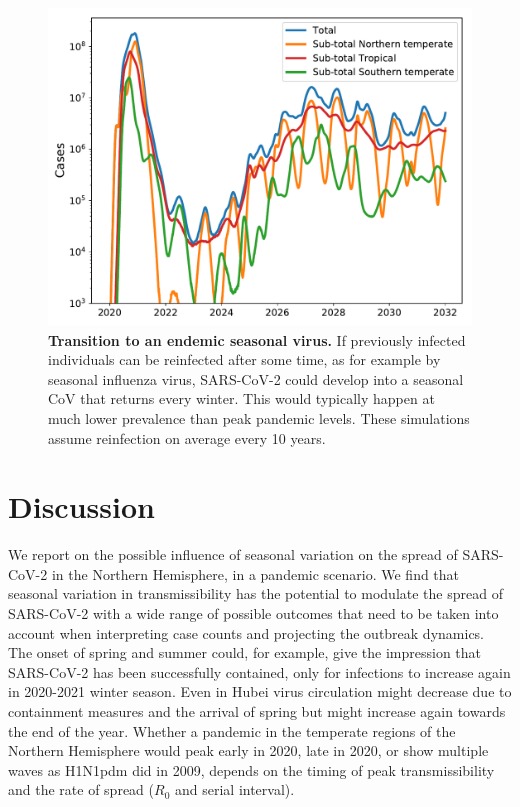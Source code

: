 \documentclass[rmp, reprint, superscriptaddress, floatfix,amsmath]{revtex4-1}
\begin{document}
\begin{figure}
    \centering
    \includegraphics[width=\columnwidth]{figures/fig_5.pdf}
    \caption{{\bf Transition to an endemic seasonal virus.}
    If previously infected individuals can be reinfected after some time, as for example by seasonal influenza virus, SARS-CoV-2 could develop into a seasonal CoV that returns every winter. This would typically happen at much lower prevalence than peak pandemic levels.
    These simulations assume reinfection on average every 10 years.}
    \label{fig:endemic}
\end{figure}

\section{Discussion}

We report on the possible influence of seasonal variation on the spread of SARS-CoV-2 in the Northern Hemisphere, in a pandemic scenario. We find that seasonal variation in transmissibility has the potential to modulate the spread of SARS-CoV-2 with a wide range of possible outcomes that need to be taken into account when interpreting case counts and projecting the outbreak dynamics.
The onset of spring and summer could, for example, give the impression that SARS-CoV-2 has been successfully contained, only for infections to increase again in 2020-2021 winter season.
Even in Hubei virus circulation might decrease due to containment measures and the arrival of spring but might increase again towards the end of the year.
Whether a pandemic in the temperate regions of the Northern Hemisphere would peak early in 2020, late in 2020, or show multiple waves as H1N1pdm did in 2009, depends on the timing of peak transmissibility and the rate of spread ($R_0$ and serial interval).
\end{document}
